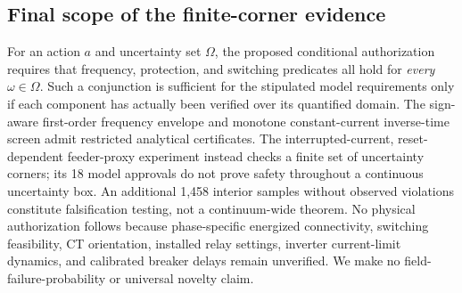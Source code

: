 \subsection{Final scope of the finite-corner evidence}
\label{sec:p12-final}
For an action \(a\) and uncertainty set \(\Omega\), the proposed conditional authorization requires that frequency, protection, and switching predicates all hold for \emph{every} \(\omega\in\Omega\). Such a conjunction is sufficient for the stipulated model requirements only if each component has actually been verified over its quantified domain. The sign-aware first-order frequency envelope and monotone constant-current inverse-time screen admit restricted analytical certificates. The interrupted-current, reset-dependent feeder-proxy experiment instead checks a finite set of uncertainty corners; its 18 model approvals do not prove safety throughout a continuous uncertainty box. An additional 1,458 interior samples without observed violations constitute falsification testing, not a continuum-wide theorem. No physical authorization follows because phase-specific energized connectivity, switching feasibility, CT orientation, installed relay settings, inverter current-limit dynamics, and calibrated breaker delays remain unverified. We make no field-failure-probability or universal novelty claim.